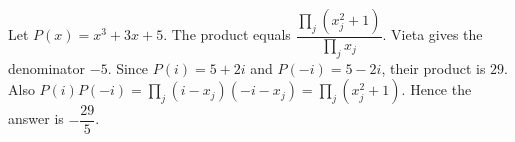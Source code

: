 Let $P(x)=x^3+3x+5$. The product equals $\dfrac{\prod_j(x_j^2+1)}{\prod_jx_j}$. Vieta gives the denominator $-5$. Since $P(i)=5+2i$ and $P(-i)=5-2i$, their product is $29$. Also $P(i)P(-i)=\prod_j(i-x_j)(-i-x_j)=\prod_j(x_j^2+1)$. Hence the answer is $\boxed{-\dfrac{29}{5}}$.
